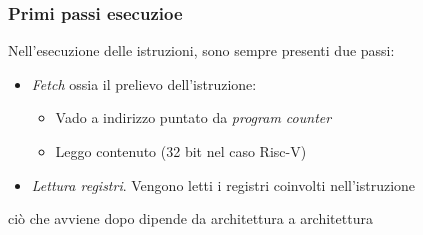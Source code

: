 \subsubsection*{Primi passi esecuzioe}
Nell'esecuzione delle istruzioni, sono sempre presenti due passi:
\begin{itemize}
	\item \textit{Fetch} ossia  il prelievo dell'istruzione:
	      \begin{itemize}
		      \item Vado a indirizzo puntato da \textit{program counter}
		      \item Leggo contenuto (32 bit nel caso Risc-V)
	      \end{itemize}
	\item \textit{Lettura registri}. Vengono letti i registri coinvolti nell'istruzione
\end{itemize}
ciò che avviene dopo dipende da architettura a architettura
